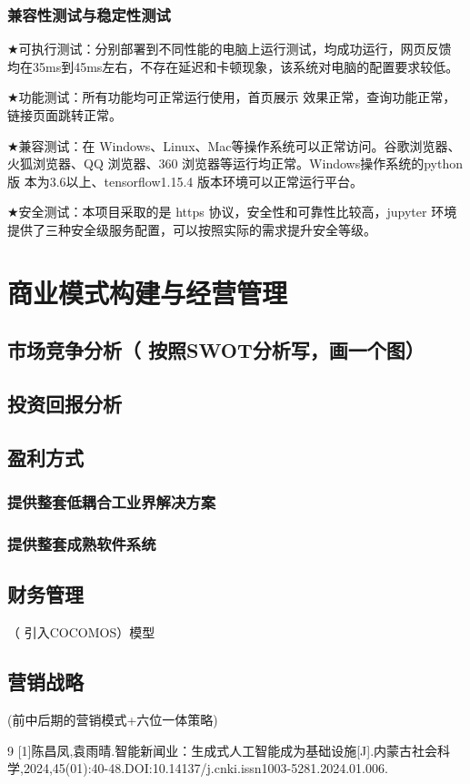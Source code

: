 \documentclass[withoutpreface,bwprint]{cumcmthesis} %
\begin{document}
	\subsubsection{ 兼容性测试与稳定性测试}
	$\bigstar$可执行测试：分别部署到不同性能的电脑上运行测试，均成功运行，网页反馈
	均在35ms到45ms左右，不存在延迟和卡顿现象，该系统对电脑的配置要求较低。\par
	$\bigstar$功能测试：所有功能均可正常运行使用，首页展示
	效果正常，查询功能正常，链接页面跳转正常。\par
	$\bigstar$兼容测试：在 Windows、Linux、Mac等操作系统可以正常访问。谷歌浏览器、
	火狐浏览器、QQ 浏览器、360 浏览器等运行均正常。Windows操作系统的python版
	本为3.6以上、tensorflow1.15.4 版本环境可以正常运行平台。\par
	$\bigstar$安全测试：本项目采取的是 https 协议，安全性和可靠性比较高，jupyter 环境
	提供了三种安全级服务配置，可以按照实际的需求提升安全等级。\par
	\newpage
	\section{商业模式构建与经营管理}
	\subsection{市场竞争分析（ 按照SWOT分析写，画一个图）}
	\subsection{投资回报分析}
	\subsection{盈利方式}
	\subsubsection{ 提供整套低耦合工业界解决方案}
	\subsubsection{ 提供整套成熟软件系统}
	\subsection{财务管理}（ 引入COCOMOS）模型
	\subsection{营销战略}(前中后期的营销模式+六位一体策略)
	\newpage
	\begin{thebibliography}{9}%
		[1]陈昌凤,袁雨晴.智能新闻业：生成式人工智能成为基础设施[J].内蒙古社会科学,2024,45(01):40-48.DOI:10.14137/j.cnki.issn1003-5281.2024.01.006.
	\end{thebibliography}
\end{document}
